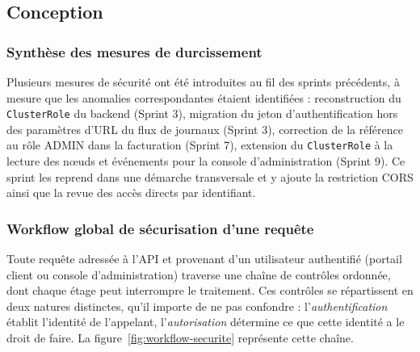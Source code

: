 \subsection{Conception}

\subsubsection{Synthèse des mesures de durcissement}

Plusieurs mesures de sécurité ont été introduites au fil des sprints précédents, à mesure que les anomalies correspondantes étaient identifiées : reconstruction du \texttt{ClusterRole} du backend (Sprint 3), migration du jeton d'authentification hors des paramètres d'URL du flux de journaux (Sprint 3), correction de la référence au rôle ADMIN dans la facturation (Sprint 7), extension du \texttt{ClusterRole} à la lecture des nœuds et événements pour la console d'administration (Sprint 9). Ce sprint les reprend dans une démarche transversale et y ajoute la restriction CORS ainsi que la revue des accès directs par identifiant.

\subsubsection{Workflow global de sécurisation d'une requête}

Toute requête adressée à l'API et provenant d'un utilisateur authentifié (portail client ou console d'administration) traverse une chaîne de contrôles ordonnée, dont chaque étage peut interrompre le traitement. Ces contrôles se répartissent en deux natures distinctes, qu'il importe de ne pas confondre : l'\emph{authentification} établit l'identité de l'appelant, l'\emph{autorisation} détermine ce que cette identité a le droit de faire. La figure~\ref{fig:workflow-securite} représente cette chaîne.

